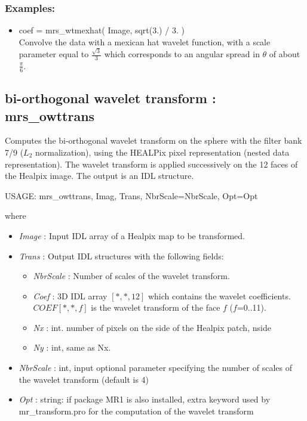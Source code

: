 \subsubsection*{Examples:} 
\begin{itemize}
\item coef = mrs\_wtmexhat( Image, sqrt(3.) / 3. ) \\
Convolve the data with a mexican hat wavelet function, with a scale parameter equal to $\frac{ \sqrt{3} }{3}$ 
which corresponds to an angular spread in $\theta$ of about $\frac{\pi}{6}$.
\end{itemize}



\subsection{bi-orthogonal wavelet transform : mrs\_owttrans}
Computes the bi-orthogonal wavelet transform on the sphere with the filter bank 7/9 ($L_2$ normalization), using 
the HEALPix pixel representation (nested data representation). The wavelet transform is applied successively on 
the 12 faces of the Healpix image. The output is an IDL structure.
{\bf
\begin{center}
     USAGE: mrs\_owttrans, Imag, Trans, NbrScale=NbrScale, Opt=Opt  
\end{center}}
where 
\begin{itemize}
\item {\em Image} : Input IDL array of a Healpix map to be transformed. 
\item {\em Trans} : Output IDL structures with the following fields:
\begin{itemize}  
\item {\em NbrScale} : Number of scales of the wavelet transform.
\item {\em Coef} : 3D IDL array $[*,*,12]$ which contains the wavelet coefficients. $COEF[*,*, f]$ is the wavelet transform of the face $f$ ($f$=0..11).
\item {\em Nx} : int. number of pixels on the side of the Healpix patch, nside
\item {\em Ny} : int, same as Nx.	 
\end{itemize}
\item {\em NbrScale} : int, input optional parameter specifying the number of scales of the wavelet transform (default is 4)
\item {\em Opt} : string: if package MR1 is also installed, extra keyword used by mr\_transform.pro for the computation of the wavelet transform
\end{itemize}

